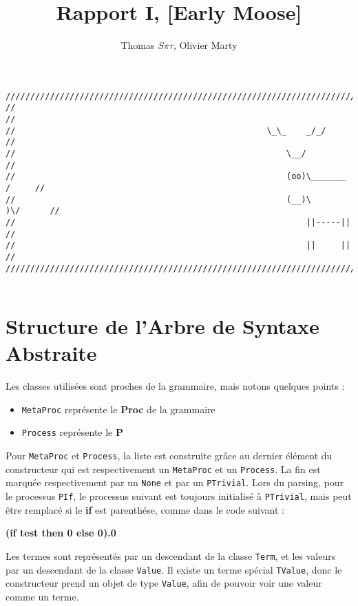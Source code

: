 \documentclass[11pt]{article} %
\title{Rapport I,  [Early Moose]}
\author{Thomas $S\pi\tau$, Olivier Marty}
\begin{document}
\maketitle

\begin{verbatim}
////////////////////////////////////////////////////////////////////////////////
//                                                                            //
//                                                   \_\_    _/_/             //
//                                                       \__/                 //
//                                                       (oo)\_______   /     //
//                                                       (__)\       )\/      //
//                                                           ||-----||        //
//                                                           ||     ||        //
////////////////////////////////////////////////////////////////////////////////  


\end{verbatim}
\section{Structure de l'Arbre de Syntaxe Abstraite}

Les classes utilisées sont proches de la grammaire, mais notons quelques points :
\begin{itemize}
 \item  \texttt{MetaProc} représente le \textbf{Proc} de la grammaire
 \item  \texttt{Process} représente le \textbf{P}
\end{itemize}

Pour \texttt{MetaProc} et \texttt{Process}, la liste est construite grâce au dernier élément du constructeur qui est respectivement un \texttt{MetaProc} et un \texttt{Process}. La fin est marquée respectivement par un \texttt{None} et par un \texttt{PTrivial}.
Lors du parsing, pour le processus \texttt{PIf}, le processus suivant est toujours initialisé à \texttt{PTrivial}, mais peut être remplacé si le \textbf{if} est parenthése, comme dans le code suivant :
\begin{center}
 \textbf{(if test then 0 else 0).0}
\end{center}

Les termes sont représentés par un descendant de la classe \texttt{Term}, et les valeurs par un descendant de la classe \texttt{Value}. Il existe un terme spécial \texttt{TValue}, donc le constructeur prend un objet de type \texttt{Value}, afin de pouvoir voir une valeur comme un terme.
\end{document}
